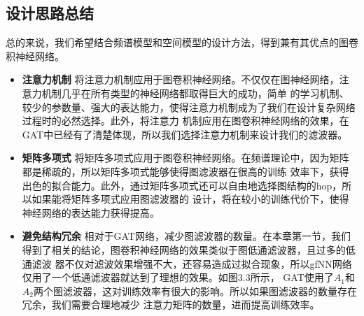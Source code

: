 \subsection{设计思路总结}
总的来说，我们希望结合频谱模型和空间模型的设计方法，得到兼有其优点的图卷积神经网络。

\begin{itemize}
    \item \textbf{注意力机制} \quad
    将注意力机制应用于图卷积神经网络。不仅仅在图神经网络，注意力机制几乎在所有类型的神经网络都取得巨大的成功，简单
    的学习机制、较少的参数量、强大的表达能力，使得注意力机制成为了我们在设计复杂网络过程时的必然选择。此外，将注意力
    机制应用在图卷积神经网络的效果，在GAT中已经有了清楚体现，所以我们选择注意力机制来设计我们的滤波器。
    
    \item \textbf{矩阵多项式} \quad
    将矩阵多项式应用于图卷积神经网络。在频谱理论中，因为矩阵都是稀疏的，所以矩阵多项式能够使得图滤波器在很高的训练
    效率下，获得出色的拟合能力。此外，通过矩阵多项式还可以自由地选择图结构的hop，所以如果能将矩阵多项式应用图滤波器的
    设计，将在较小的训练代价下，使得神经网络的表达能力获得提高。

    \item \textbf{避免结构冗余} \quad
    相对于GAT网络，减少图滤波器的数量。在本章第一节，我们得到了相关的结论，图卷积神经网络的效果类似于图低通滤波器，且过多的低通滤波
    器不仅对滤波效果增强不大，还容易造成过拟合现象，所以gfNN网络仅用了一个低通滤波器就达到了理想的效果。如图3.3所示，
    GAT使用了$A_{1}$和$A_{2}$两个图滤波器，这对训练效率有很大的影响。所以如果图滤波器的数量存在冗余，我们需要合理地减少
    注意力矩阵的数量，进而提高训练效率。

\end{itemize}


